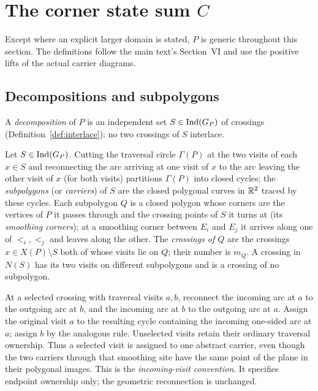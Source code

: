 \section{The corner state sum \texorpdfstring{$C$}{C}}\label{sec:statesum}

Except where an explicit larger domain is stated, $P$ is generic
throughout this section. The definitions follow the main
text's Section~VI and use the positive lifts of the actual carrier diagrams.

\subsection{Decompositions and subpolygons}

\begin{definition}[decomposition]\label{def:decomposition}
A \emph{decomposition} of $P$ is an independent set $S\in\operatorname{Ind}(G_P)$ of
crossings (Definition~\ref{def:interlace}): no two crossings of $S$ interlace.
\end{definition}

\begin{definition}\label{def:smoothing}
Let $S\in\operatorname{Ind}(G_P)$. Cutting the traversal circle $\Gamma(P)$ at the two
visits of each $x\in S$ and reconnecting the arc arriving at one visit of $x$
to the arc leaving the other visit of $x$ (for both visits) partitions
$\Gamma(P)$ into closed cycles; the \emph{subpolygons} (or \emph{carriers})
of $S$ are the closed polygonal curves in $\mathbb R^2$ traced by these cycles. Each
subpolygon $Q$ is a closed polygon whose corners are the vertices of $P$ it
passes through and the crossing points of $S$ it turns at (its
\emph{smoothing corners}); at a smoothing corner between $E_i$ and $E_j$ it
arrives along one of $\lt_i,\lt_j$ and leaves along the other. The
\emph{crossings of $Q$} are the crossings $x\in X(P)\setminus S$ both of whose
visits lie on $Q$; their number is $m_Q$. A crossing in $N(S)$ has its two
visits on different subpolygons and is a crossing of no subpolygon.
\end{definition}

\begin{convention}\label{conv:selected-visits}
At a selected crossing with traversal visits $a,b$, reconnect the incoming
arc at $a$ to the outgoing arc at $b$, and the incoming arc at $b$ to the
outgoing arc at $a$. Assign the original visit $a$ to the resulting cycle
containing the incoming one-sided arc at $a$; assign $b$ by the analogous
rule. Unselected visits retain their ordinary traversal ownership.
Thus a selected visit is assigned to one abstract carrier, even though
the two carriers through that smoothing site have the same point of the
plane in their polygonal images. This is the \emph{incoming-visit convention}.
It specifies endpoint ownership only; the geometric reconnection is unchanged.
\end{convention}

